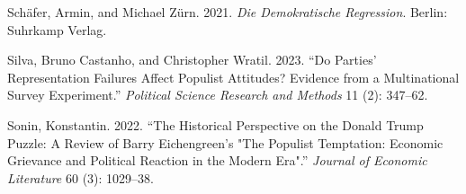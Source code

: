 \documentclass[
]{article}
\newlength{\cslhangindent}
\newlength{\cslentryspacingunit} %
\newenvironment{CSLReferences}[2] %
 {%
  \setlength{\parindent}{0pt}
  \ifodd #1
  \let\oldpar\par
  \def\par{\hangindent=\cslhangindent\oldpar}
  \fi
  \setlength{\parskip}{#2\cslentryspacingunit}
 }%
 {}
\begin{document}
\begin{CSLReferences}{1}{0}
\leavevmode{}%
Schäfer, Armin, and Michael Zürn. 2021. \emph{Die Demokratische
{Regression}}. Berlin: Suhrkamp Verlag.

\leavevmode{}%
Silva, Bruno Castanho, and Christopher Wratil. 2023. {``Do Parties'
Representation Failures Affect Populist Attitudes? {Evidence} from a
Multinational Survey Experiment.''} \emph{Political Science Research and
Methods} 11 (2): 347--62.

\leavevmode{}%
Sonin, Konstantin. 2022. {``The {Historical} {Perspective} on the
{Donald} {Trump} {Puzzle}: {A} {Review} of {Barry} {Eichengreen}'s
"{The} {Populist} {Temptation}: {Economic} {Grievance} and {Political}
{Reaction} in the {Modern} {Era}".''} \emph{Journal of Economic
Literature} 60 (3): 1029--38.

\end{CSLReferences}
\end{document}
